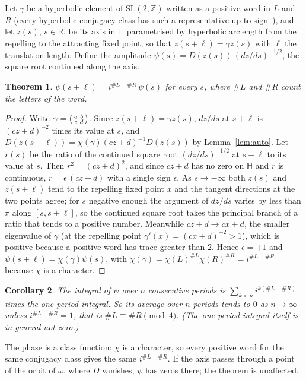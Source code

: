 \documentclass[11pt]{article}
\newtheorem{theorem}{Theorem}
\newtheorem{corollary}[theorem]{Corollary}
\theoremstyle{remark}
\newcommand{\SL}{\mathrm{SL}}
\newcommand{\Z}{\mathbb{Z}}
\newcommand{\R}{\mathbb{R}}
\newcommand{\Hb}{\mathbb{H}}
\begin{document}
Let $\gamma$ be a hyperbolic element of $\SL(2,\Z)$ written as a positive word in $L$ and $R$ (every hyperbolic conjugacy
class has such a representative up to sign~\cite{Series1985}), and let $z(s)$, $s\in\R$, be its axis in $\Hb$ parametrised by
hyperbolic arclength from the repelling to the attracting fixed point, so that $z(s+\ell)=\gamma z(s)$ with $\ell$ the
translation length. Define the amplitude $\psi(s)=D(z(s))\,(dz/ds)^{-1/2}$, the square root continued along the axis.

\begin{theorem}\label{thm:phase}
$\psi(s+\ell)=i^{\#L-\#R}\,\psi(s)$ for every $s$, where $\#L$ and $\#R$ count the letters of the word.
\end{theorem}
\begin{proof}
Write $\gamma=\begin{psmallmatrix}a&b\\c&d\end{psmallmatrix}$. Since $z(s+\ell)=\gamma z(s)$, $dz/ds$ at $s+\ell$ is $(cz+d)^{-2}$ times its
value at $s$, and $D(z(s+\ell))=\chi(\gamma)(cz+d)^{-1}D(z(s))$ by Lemma~\ref{lem:auto}. Let $r(s)$ be the ratio of the continued
square root $(dz/ds)^{-1/2}$ at $s+\ell$ to its value at $s$. Then $r^2=(cz+d)^2$, and since $cz+d$ has no zero on $\Hb$ and $r$
is continuous, $r=\epsilon\,(cz+d)$ with a single sign $\epsilon$. As $s\to-\infty$ both $z(s)$ and $z(s+\ell)$ tend to the
repelling fixed point $x$ and the tangent directions at the two points agree; for $s$ negative enough the argument of
$dz/ds$ varies by less than $\pi$ along $[s,s+\ell]$, so the continued square root takes the principal branch of a ratio
that tends to a positive number. Meanwhile $cz+d\to cx+d$, the smaller eigenvalue of $\gamma$ (at the repelling point
$\gamma'(x)=(cx+d)^{-2}>1$), which is positive because a positive word has trace greater than $2$. Hence $\epsilon=+1$ and $\psi(s+\ell)=\chi(\gamma)\psi(s)$, with
$\chi(\gamma)=\chi(L)^{\#L}\chi(R)^{\#R}=i^{\#L-\#R}$ because $\chi$ is a character.
\end{proof}

\begin{corollary}
The integral of $\psi$ over $n$ consecutive periods is $\sum_{k<n}i^{k(\#L-\#R)}$ times the one-period integral. So its
average over $n$ periods tends to $0$ as $n\to\infty$ unless $i^{\#L-\#R}=1$, that is $\#L\equiv\#R\pmod 4$. (The one-period
integral itself is in general not zero.)
\end{corollary}

The phase is a class function: $\chi$ is a character, so every positive word for the same conjugacy class gives the same
$i^{\#L-\#R}$. If the axis passes through a point of the orbit of $\omega$, where $D$ vanishes, $\psi$ has zeros there; the
theorem is unaffected.
\end{document}
